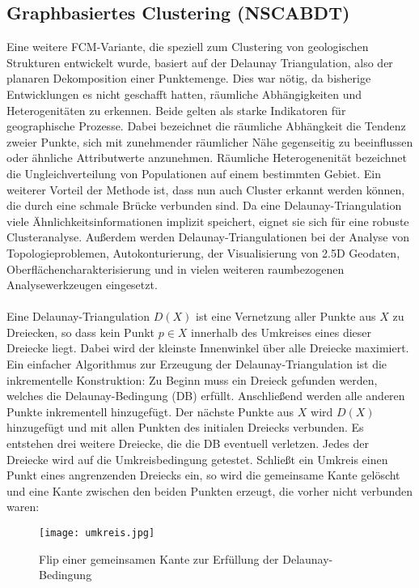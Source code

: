\documentclass[11pt,ceqn]{book}
\begin{document}
\subsection{Graphbasiertes Clustering (NSCABDT)}
Eine weitere FCM-Variante, die speziell zum Clustering von geologischen Strukturen entwickelt wurde, basiert auf der Delaunay Triangulation, also der planaren Dekomposition einer Punktemenge\cite{nscabdt}. Dies war nötig, da bisherige Entwicklungen es nicht geschafft hatten, räumliche Abhängigkeiten und Heterogenitäten zu erkennen. Beide gelten als starke Indikatoren für geographische Prozesse. Dabei bezeichnet die räumliche Abhängkeit die Tendenz zweier Punkte, sich mit zunehmender räumlicher Nähe gegenseitig zu beeinflussen oder ähnliche Attributwerte anzunehmen\cite{dependency}. Räumliche Heterogenenität bezeichnet die Ungleichverteilung von Populationen auf einem bestimmten Gebiet. Ein weiterer Vorteil der Methode ist, dass nun auch Cluster erkannt werden können, die durch eine schmale Brücke verbunden sind. Da eine Delaunay-Triangulation viele Ähnlichkeitsinformationen implizit speichert, eignet sie sich für eine robuste Clusteranalyse. Außerdem werden Delaunay-Triangulationen bei der Analyse von Topologieproblemen, Autokonturierung, der Visualisierung von 2.5D Geodaten, Oberflächencharakterisierung und in vielen weiteren raumbezogenen Analysewerkzeugen eingesetzt.
\\~\\
Eine Delaunay-Triangulation $D(X)$ ist eine Vernetzung aller Punkte aus $X$ zu Dreiecken, so dass kein Punkt $p\in X$ innerhalb des Umkreises eines dieser Dreiecke liegt. Dabei wird der kleinste Innenwinkel über alle Dreiecke maximiert.
\\
Ein einfacher Algorithmus zur Erzeugung der Delaunay-Triangulation ist die inkrementelle Konstruktion:
Zu Beginn muss ein Dreieck gefunden werden, welches die Delaunay-Bedingung (DB) erfüllt. Anschließend werden alle anderen Punkte inkrementell hinzugefügt. Der nächste Punkte aus $X$ wird $D(X)$ hinzugefügt und mit allen Punkten des initialen Dreiecks verbunden. Es entstehen drei weitere Dreiecke, die die DB eventuell verletzen. Jedes der Dreiecke wird auf die Umkreisbedingung getestet. Schließt ein Umkreis einen Punkt eines angrenzenden Dreiecks ein, so wird die gemeinsame Kante gelöscht und eine Kante zwischen den beiden Punkten erzeugt, die vorher nicht verbunden waren:

\begin{figure}[H]
\centering
\texttt{[image: umkreis.jpg]}
\caption{Flip einer gemeinsamen Kante zur Erfüllung der Delaunay-Bedingung}
\end{figure}
\end{document}
